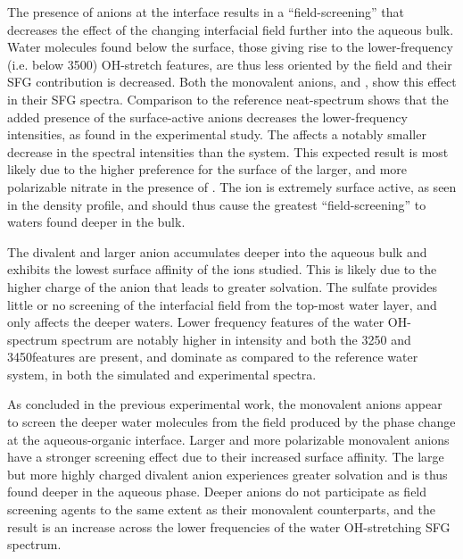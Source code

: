 The presence of anions at the interface results in a ``field-screening'' that decreases the effect of the changing interfacial field further into the aqueous bulk. Water molecules found below the surface, those giving rise to the lower-frequency (i.e. below 3500\cm) OH-stretch features, are thus less oriented by the field and their SFG contribution is decreased. Both the monovalent anions, \cl and \nit, show this effect in their SFG spectra. Comparison to the reference neat-\wat spectrum shows that the added presence of the surface-active anions decreases the lower-frequency intensities, as found in the experimental study. The \cl affects a notably smaller decrease in the spectral intensities than the \nit system. This expected result is most likely due to the higher preference for the surface of the larger, and more polarizable nitrate in the presence of \ctc. The \nit ion is extremely surface active, as seen in the density profile, and should thus cause the greatest ``field-screening'' to waters found deeper in the bulk.

The divalent and larger \sul anion accumulates deeper into the aqueous bulk and exhibits the lowest surface affinity of the ions studied. This is likely due to the higher charge of the anion that leads to greater solvation. The sulfate provides little or no screening of the interfacial field from the top-most water layer, and only affects the deeper waters. Lower frequency features of the water OH-spectrum spectrum are notably higher in intensity and both the 3250 and 3450\cm features are present, and dominate as compared to the reference water system, in both the simulated and experimental spectra.

As concluded in the previous experimental work, the monovalent anions appear to screen the deeper water molecules from the field produced by the phase change at the aqueous-organic interface. Larger and more polarizable monovalent anions have a stronger screening effect due to their increased surface affinity. The large but more highly charged divalent anion experiences greater solvation and is thus found deeper in the aqueous phase. Deeper anions do not participate as field screening agents to the same extent as their monovalent counterparts, and the result is an increase across the lower frequencies of the water OH-stretching SFG spectrum.
